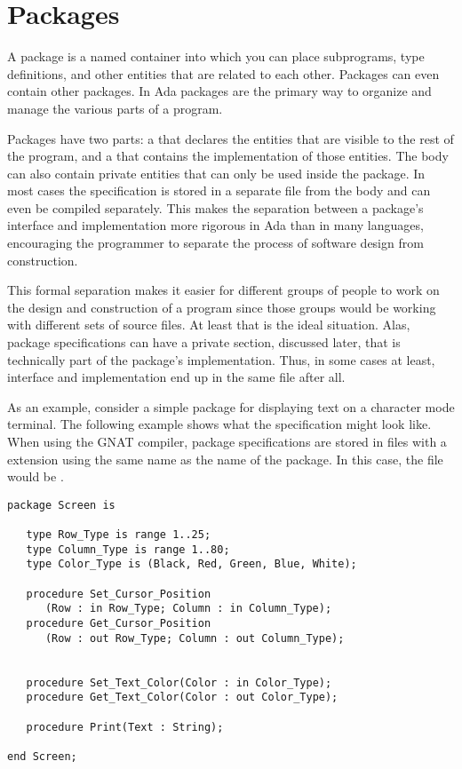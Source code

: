 \section{Packages}
\label{sec:packages}

A package is a named container into which you can place subprograms, type definitions, and other
entities that are related to each other. Packages can even contain other packages. In Ada
packages are the primary way to organize and manage the various parts of a program.

Packages have two parts: a  that declares the entities that are visible
to the rest of the program, and a  that contains the implementation of those
entities. The body can also contain private entities that can only be used inside the package.
In most cases the specification is stored in a separate file from the body and can even be
compiled separately. This makes the separation between a package's interface and implementation
more rigorous in Ada than in many languages, encouraging the programmer to separate the process
of software design from construction.

This formal separation makes it easier for different groups of people to work on the design and
construction of a program since those groups would be working with different sets of source
files. At least that is the ideal situation. Alas, package specifications can have a private
section, discussed later, that is technically part of the package's implementation. Thus, in
some cases at least, interface and implementation end up in the same file after all.

As an example, consider a simple package for displaying text on a character mode terminal. The
following example shows what the specification might look like. When using the GNAT compiler,
package specifications are stored in files with a  extension using the same name
as the name of the package. In this case, the file would be .

\begin{lstlisting}
package Screen is

   type Row_Type is range 1..25;
   type Column_Type is range 1..80;
   type Color_Type is (Black, Red, Green, Blue, White);

   procedure Set_Cursor_Position
      (Row : in Row_Type; Column : in Column_Type);
   procedure Get_Cursor_Position
      (Row : out Row_Type; Column : out Column_Type);


   procedure Set_Text_Color(Color : in Color_Type);
   procedure Get_Text_Color(Color : out Color_Type);

   procedure Print(Text : String);

end Screen;
\end{lstlisting}

